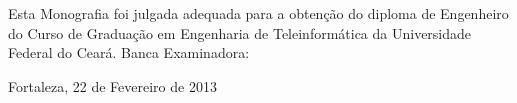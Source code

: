 \thispagestyle{empty}%

\begin{center}
    \textsc{ \autor } \\
     \vspace{.5 cm} \textbf{ \titulo }     \\
\end{center}
    \vspace{.2 cm}
    Esta Monografia foi julgada adequada para a obten\c{c}\~{a}o do diploma de Engenheiro do Curso de Gradua\c{c}\~{a}o em Engenharia de Teleinform\'{a}tica da Universidade Federal do Cear\'{a}.
    \assinatura{\autor}
    \vspace{2 cm}
     Banca Examinadora:

     \vspace{5 cm}%


\begin{center}
    {\normalsize    Fortaleza, 22 de Fevereiro de 2013}
\end{center}
